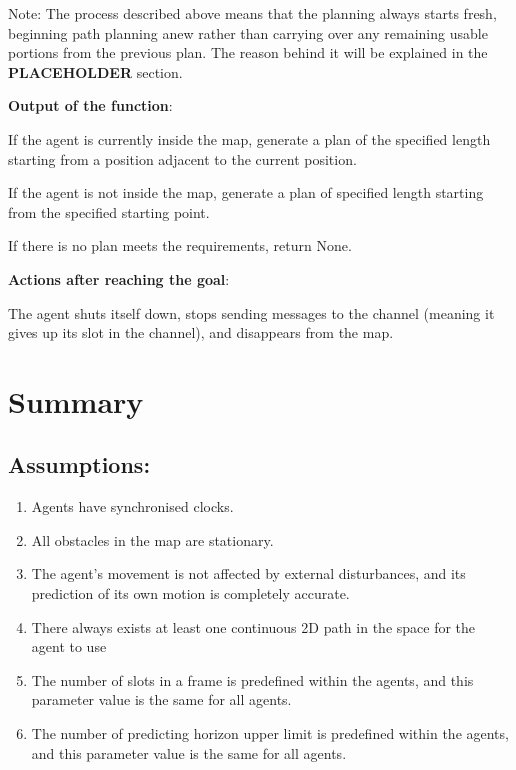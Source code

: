 Note: The process described above means that the planning always starts fresh, beginning path planning anew rather than carrying over any remaining usable portions from the previous plan. The reason behind it will be explained in the \textbf{PLACEHOLDER} section.

\textbf{Output of the function}:

If the agent is currently inside the map, generate a plan of the specified length starting from a position adjacent to the current position.

If the agent is not inside the map, generate a plan of specified length starting from the specified starting point.

If there is no plan meets the requirements, return None.

\textbf{Actions after reaching the goal}:

The agent shuts itself down, stops sending messages to the channel (meaning it gives up its slot in the channel), and disappears from the map.

\section{Summary}

\subsection{Assumptions:}
\begin{enumerate}
    \item Agents have synchronised clocks.
    \item All obstacles in the map are stationary.
    \item The agent’s movement is not affected by external disturbances, and
    its prediction of its own motion is completely accurate.
    \item There always exists at least one continuous 2D path in the space
    for the agent to use
    \item  The number of slots in a frame is predefined within the agents, and
    this parameter value is the same for all agents.
    \item The number of predicting horizon upper limit is predefined within the
    agents, and this parameter value is the same for all agents.
\end{enumerate}

